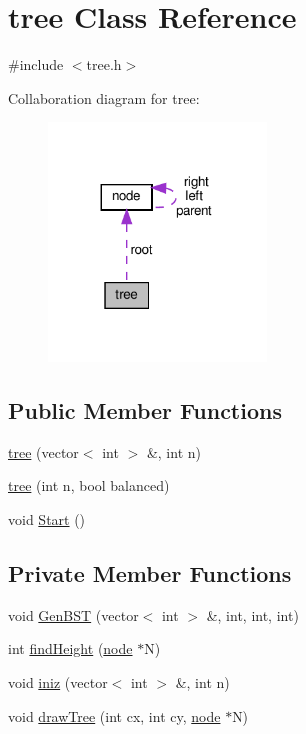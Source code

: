 \hypertarget{classtree}{}\section{tree Class Reference}
\label{classtree}


{\ttfamily \#include $<$tree.\+h$>$}



Collaboration diagram for tree\+:
\nopagebreak
\begin{figure}[H]
\begin{center}
\leavevmode
\includegraphics[width=164pt]{classtree__coll__graph}
\end{center}
\end{figure}
\subsection*{Public Member Functions}
\begin{DoxyCompactItemize}
\item 
\hyperlink{classtree_a943d10650f183701ae0414689c9b9ee8}{tree} (vector$<$ int $>$ \&, int n)
\item 
\hyperlink{classtree_a529a530e3787fdaee02ed65cbf1f17ff}{tree} (int n, bool balanced)
\item 
void \hyperlink{classtree_a48edff6ad24225010aa16b36182185d4}{Start} ()
\end{DoxyCompactItemize}
\subsection*{Private Member Functions}
\begin{DoxyCompactItemize}
\item 
void \hyperlink{classtree_a5aa82979670b726692fdf9d0df4248de}{Gen\+B\+ST} (vector$<$ int $>$ \&, int, int, int)
\item 
int \hyperlink{classtree_ac07199db0ed26e80db1ec481bcba7380}{find\+Height} (\hyperlink{structnode}{node} $\ast$N)
\item 
void \hyperlink{classtree_a4dc5cf9375c65041ac594c810072be50}{iniz} (vector$<$ int $>$ \&, int n)
\item 
void \hyperlink{classtree_a09613a8cf3f28dfa51dfd06ceeb90fa0}{draw\+Tree} (int cx, int cy, \hyperlink{structnode}{node} $\ast$N)
\end{DoxyCompactItemize}

